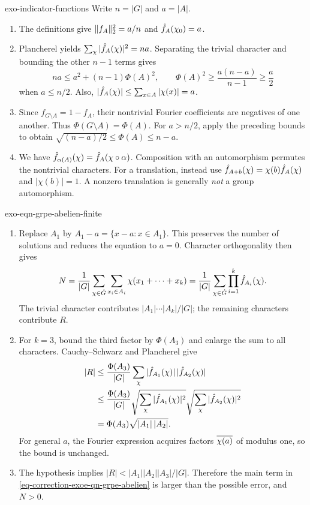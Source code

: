 \begin{correction}{exo-indicator-functions}
Write $n=|G|$ and $a=|A|$.
\begin{enumerate}
\item The definitions give $\lVert f_A\rVert_2^2=a/n$ and
$\hat{f}_A(\chi_0)=a$.
\item Plancherel yields $\sum_\chi|\hat{f}_A(\chi)|^2=na$.
Separating the trivial character and bounding the other $n-1$ terms gives
\[
 na\leq a^2+(n-1)\Phi(A)^2,\qquad
 \Phi(A)^2\geq\frac{a(n-a)}{n-1}\geq\frac a2
\]
when $a\leq n/2$. Also,
$|\hat{f}_A(\chi)|\leq\sum_{x\in A}|\chi(x)|=a$.
\item Since $f_{G\setminus A}=1-f_A$, their nontrivial Fourier coefficients
are negatives of one another. Thus $\Phi(G\setminus A)=\Phi(A)$.
For $a>n/2$, apply the preceding bounds to obtain
$\sqrt{(n-a)/2}\leq\Phi(A)\leq n-a$.
\item We have
$\hat{f}_{\alpha(A)}(\chi)=\hat{f}_A(\chi\circ\alpha)$.
Composition with an automorphism permutes the nontrivial characters.
For a translation, instead use
$\hat{f}_{A+b}(\chi)=\chi(b)\hat{f}_A(\chi)$ and $|\chi(b)|=1$.
A nonzero translation is generally \emph{not} a group automorphism.
\end{enumerate}
\end{correction}

\begin{correction}{exo-eqn-grpe-abelien-finite}
\begin{enumerate}
\item Replace $A_1$ by $A_1-a=\{x-a:x\in A_1\}$.
This preserves the number of solutions and reduces the equation to $a=0$.
Character orthogonality then gives
\begin{equation}
\label{eq-correction-exoe-qn-grpe-abelien}
 N=\frac1{|G|}\sum_{\chi\in\hat{G}}
     \sum_{x_i\in A_i}\chi(x_1+\cdots+x_k)
  =\frac1{|G|}\sum_{\chi\in\hat{G}}\prod_{i=1}^k\hat{f}_{A_i}(\chi).
\end{equation}
The trivial character contributes $|A_1|\cdots|A_k|/|G|$; the remaining
characters contribute $R$.
\item For $k=3$, bound the third factor by $\Phi(A_3)$ and enlarge the sum
to all characters. Cauchy--Schwarz and Plancherel give
\begin{align*}
 |R|&\leq\frac{\Phi(A_3)}{|G|}
       \sum_\chi|\hat{f}_{A_1}(\chi)|\,|\hat{f}_{A_2}(\chi)|\\
 &\leq\frac{\Phi(A_3)}{|G|}
       \sqrt{\sum_\chi|\hat{f}_{A_1}(\chi)|^2}
       \sqrt{\sum_\chi|\hat{f}_{A_2}(\chi)|^2}\\
 &=\Phi(A_3)\sqrt{|A_1|\,|A_2|}.
\end{align*}
For general $a$, the Fourier expression acquires factors $\overline{\chi(a)}$
of modulus one, so the bound is unchanged.
\item The hypothesis implies
$|R|<|A_1||A_2||A_3|/|G|$. Therefore the main term in
\eqref{eq-correction-exoe-qn-grpe-abelien} is larger than the possible error,
and $N>0$.
\end{enumerate}
\end{correction}

